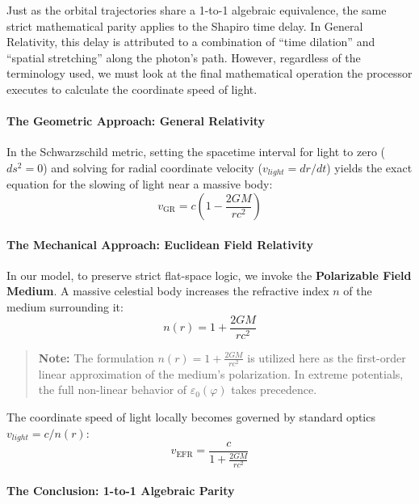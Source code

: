 \documentclass[
]{article}
\begin{document}
Just as the orbital trajectories share a 1-to-1 algebraic equivalence,
the same strict mathematical parity applies to the Shapiro time delay.
In General Relativity, this delay is attributed to a combination of
``time dilation'' and ``spatial stretching'' along the photon's path.
However, regardless of the terminology used, we must look at the final
mathematical operation the processor executes to calculate the
coordinate speed of light.

\paragraph{The Geometric Approach: General
Relativity}\label{the-geometric-approach-general-relativity}

In the Schwarzschild metric, setting the spacetime interval for light to
zero (\(ds^2 = 0\)) and solving for radial coordinate velocity
(\(v_{light} = dr/dt\)) yields the exact equation for the slowing of
light near a massive body:
\[ v_{\text{GR}} = c \left( 1 - \frac{2GM}{rc^2} \right) \]

\paragraph{The Mechanical Approach: Euclidean Field
Relativity}\label{the-mechanical-approach-euclidean-field-relativity-1}

In our model, to preserve strict flat-space logic, we invoke the
\textbf{Polarizable Field Medium}. A massive celestial body increases
the refractive index \(n\) of the medium surrounding it:
\[ n(r) = 1 + \frac{2GM}{rc^2} \]

\begin{quote}
\textbf{Note:} The formulation \(n(r) = 1 + \frac{2GM}{rc^2}\) is
utilized here as the first-order linear approximation of the medium's
polarization. In extreme potentials, the full non-linear behavior of
\(\varepsilon_0(\varphi)\) takes precedence.
\end{quote}

The coordinate speed of light locally becomes governed by standard
optics \(v_{light} = c / n(r)\):
\[ v_{\text{EFR}} = \frac{c}{1 + \frac{2GM}{rc^2}} \]

\paragraph{The Conclusion: 1-to-1 Algebraic
Parity}\label{the-conclusion-1-to-1-algebraic-parity}
\end{document}

